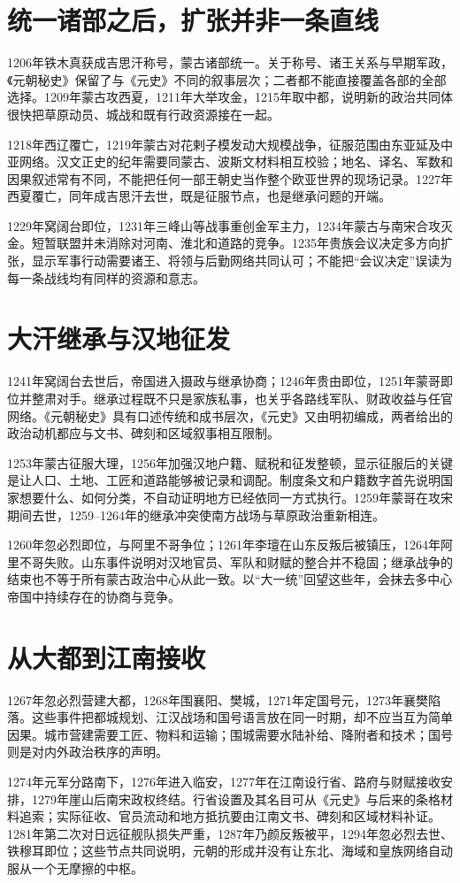 \section{统一诸部之后，扩张并非一条直线}

1206年铁木真获成吉思汗称号，蒙古诸部统一。关于称号、诸王关系与早期军政，《元朝秘史》保留了与《元史》不同的叙事层次；二者都不能直接覆盖各部的全部选择。1209年蒙古攻西夏，1211年大举攻金，1215年取中都，说明新的政治共同体很快把草原动员、城战和既有行政资源接在一起。

1218年西辽覆亡，1219年蒙古对花剌子模发动大规模战争，征服范围由东亚延及中亚网络。汉文正史的纪年需要同蒙古、波斯文材料相互校验；地名、译名、军数和因果叙述常有不同，不能把任何一部王朝史当作整个欧亚世界的现场记录。1227年西夏覆亡，同年成吉思汗去世，既是征服节点，也是继承问题的开端。

1229年窝阔台即位，1231年三峰山等战事重创金军主力，1234年蒙古与南宋合攻灭金。短暂联盟并未消除对河南、淮北和道路的竞争。1235年贵族会议决定多方向扩张，显示军事行动需要诸王、将领与后勤网络共同认可；不能把“会议决定”误读为每一条战线均有同样的资源和意志。

\section{大汗继承与汉地征发}

1241年窝阔台去世后，帝国进入摄政与继承协商；1246年贵由即位，1251年蒙哥即位并整肃对手。继承过程既不只是家族私事，也关乎各路线军队、财政收益与任官网络。《元朝秘史》具有口述传统和成书层次，《元史》又由明初编成，两者给出的政治动机都应与文书、碑刻和区域叙事相互限制。

1253年蒙古征服大理，1256年加强汉地户籍、赋税和征发整顿，显示征服后的关键是让人口、土地、工匠和道路能够被记录和调配。制度条文和户籍数字首先说明国家想要什么、如何分类，不自动证明地方已经依同一方式执行。1259年蒙哥在攻宋期间去世，1259--1264年的继承冲突使南方战场与草原政治重新相连。

1260年忽必烈即位，与阿里不哥争位；1261年李璮在山东反叛后被镇压，1264年阿里不哥失败。山东事件说明对汉地官员、军队和财赋的整合并不稳固；继承战争的结束也不等于所有蒙古政治中心从此一致。以“大一统”回望这些年，会抹去多中心帝国中持续存在的协商与竞争。

\section{从大都到江南接收}

1267年忽必烈营建大都，1268年围襄阳、樊城，1271年定国号元，1273年襄樊陷落。这些事件把都城规划、江汉战场和国号语言放在同一时期，却不应当互为简单因果。城市营建需要工匠、物料和运输；围城需要水陆补给、降附者和技术；国号则是对内外政治秩序的声明。

1274年元军分路南下，1276年进入临安，1277年在江南设行省、路府与财赋接收安排，1279年崖山后南宋政权终结。行省设置及其名目可从《元史》与后来的条格材料追索；实际征收、官员流动和地方抵抗要由江南文书、碑刻和区域材料补证。1281年第二次对日远征舰队损失严重，1287年乃颜反叛被平，1294年忽必烈去世、铁穆耳即位；这些节点共同说明，元朝的形成并没有让东北、海域和皇族网络自动服从一个无摩擦的中枢。
